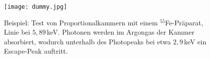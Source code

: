 \begin{figure}[H]
	\centering
	\texttt{[image: dummy.jpg]}
	\caption{Beispiel: Test von Proportionalkammern mit einem $^{55}$Fe-Präparat, Linie bei
	$5{,}89\,$keV. Photonen werden im Argongas der Kammer absorbiert, wodurch unterhalb des Photopeaks
	bei etwa $2{,}9\,$keV ein Escape-Peak auftritt.
	}
	\label{escapepeak}
\end{figure}
